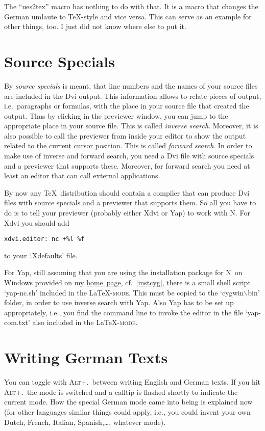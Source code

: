 \documentclass{article}
\newcommand{\latexpack}{\LaTeX-\textsc{mode}}
\newcommand{\nedit}{N\kern-0.8pt{Edit}}
\newcommand{\myhome}{\href{http://nedit.gmxhome.de}{home~page}}
\newcommand{\keyname}[1]{\textsc{#1}}
\newcommand{\file}[1]{`#1'}
\begin{document}
The ``ues2tex'' macro has nothing to do with that. It is a macro that changes the German umlaute to \TeX-style and vice versa. This can serve as an example for other things, too. I just did not know where else to put it.

\section{Source Specials}\label{sspecials} 
By \emph{source specials} is meant, that line numbers and the names of your source files are included in the Dvi output. This information allows to relate pieces of output, i.e.~paragraphs or formulas, with the place in your source file that created the output. Thus by clicking in the previewer window, you can jump to the appropriate place in your source file. This is called \emph{inverse search}. Moreover, it is also possible to call the previewer from inside your editor to show the output related to the current cursor position. This is called \emph{forward search}. In order to make use of inverse and forward search, you need a Dvi file with source specials and a previewer that supports these. Moreover, for forward search you need at least an editor that can call external applications.

By now any \TeX\ distribution should contain a compiler that can produce Dvi files with source specials and a previewer that supports them. So all you have to do is to tell your previewer (probably either Xdvi or Yap) to work with \nedit. For Xdvi you should add%
\begin{verbatim}
xdvi.editor: nc +%l %f
\end{verbatim}%
\noindent to your \file{.Xdefaults} file. 

For Yap, still assuming that you are using the installation package for \nedit\ on Windows provided on my \myhome, cf.~\ref{instcyg},  there is a small shell script `yap-nc.sh' included in the \latexpack. This must be copied to the `cygwin$\backslash$bin' folder, in order to use inverse search with Yap. Also Yap has to be set up appropriately, i.e., you find the command line to invoke the editor in the file \file{yap-com.txt} also included in the \latexpack.


\section{Writing German Texts}\label{writegerman} 
You can toggle with \keyname{Alt+.}~between writing English and German texts. If you hit \keyname{Alt+.}~the mode is switched and a calltip is flashed shortly to indicate the current mode. How the special German mode came into being is explained now (for other languages similar things could apply, i.e., you could invent your own Dutch, French, Italian, Spanish,\ldots, whatever mode).
\end{document}

